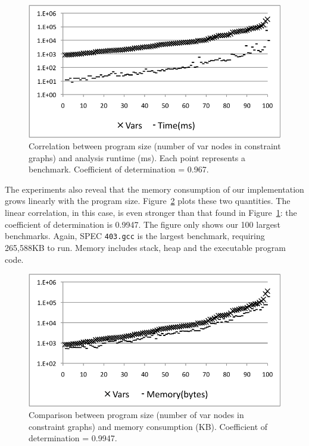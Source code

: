 \documentclass{sigplanconf}[10pt]
\begin{document}
\begin{figure}[t!]
\begin{center}
\includegraphics[width=\columnwidth]{images/TimeCorr}
\end{center}
\caption{\label{fig:TimeCorr}
Correlation between program size (number of var nodes in constraint
graphs) and analysis runtime (ms).
Each point represents a benchmark.
Coefficient of determination = 0.967.
}
\end{figure}

The experiments also reveal that the memory consumption of our implementation
grows linearly with the program size.
Figure~\ref{fig:MemCorr} plots these two quantities.
The linear correlation, in this case, is even stronger than that found in
Figure~\ref{fig:TimeCorr}: the coefficient of determination is 0.9947.
The figure only shows our 100 largest benchmarks.
Again, SPEC \texttt{403.gcc} is the largest benchmark, requiring
265,588KB to run.
Memory includes stack, heap and the executable program code.

\begin{figure}[t!]
\begin{center}
\includegraphics[width=\columnwidth]{images/MemCorr}
\end{center}
\caption{\label{fig:MemCorr}
Comparison between program size (number of var nodes in constraint
graphs) and memory consumption (KB).
Coefficient of determination = 0.9947.
}
\end{figure}
\end{document}
